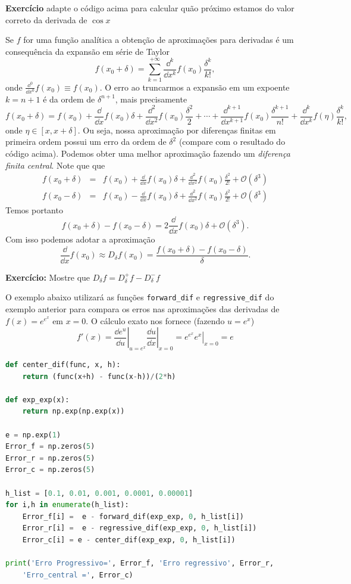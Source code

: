 {\bf Exercício} adapte o código acima para calcular quão próximo estamos do valor correto da derivada de $\cos x$

Se $f$ for uma função analítica a obtenção de aproximações para derivadas é um consequência 
da expansão em série de Taylor
\[ f(x_0+\delta) = \sum_{k=1}^{+\infty} \frac{\dd^k}{\dd x^k}f(x_0) \frac{\delta^k}{k!},\]
onde $\frac{\dd^{0}}{\dd x^{0}} f(x_0) \equiv f(x_0)$. O erro ao truncarmos a expansão em um expoente $k=n+1$ é da ordem de $\delta^{n+1}$, mais precisamente
\[ f(x_0+\delta) = f(x_0) + \frac{\dd}{\dd x} f(x_0)\delta + \frac{\dd^2}{\dd x^2}f(x_0) \frac{\delta^2}{2} + \cdots + \frac{\dd^{k+1}}{\dd x^{k+1}}f(x_0) \frac{\delta^{k+1}}{n!}+\frac{\dd^k}{\dd x^k}f(\eta) \frac{\delta^k}{k!},\]
onde $\eta \in [x, x+\delta]$. Ou seja, nossa aproximação por diferenças finitas em primeira ordem possui um erro da ordem de $\delta^2$ (compare com o resultado do código acima). Podemos obter uma melhor aproximação fazendo um {\it diferença finita central}. Note que que
\[\begin{array}{rcl}
f(x_0+\delta) & = & f(x_0) + \frac{\dd}{\dd x}f(x_0) \delta + \frac{\dd^2}{\dd x^2}f(x_0)  \frac{\delta^2}{2!}+ \mathcal{O}(\delta^3)\\
f(x_0-\delta) & = & f(x_0) - \frac{\dd}{\dd x}f(x_0) \delta + \frac{\dd^2}{\dd x^2}f(x_0)  \frac{\delta^2}{2!}+ \mathcal{O}(\delta^3)
\end{array}\]
Temos portanto
\[f(x_0+\delta) - f(x_0-\delta) = 2 \frac{\dd}{\dd x}f(x_0) \delta + \mathcal{O}(\delta^3).\]
Com isso podemos adotar a aproximação
\[\frac{\dd }{\dd x} f(x_0) \approx D_\delta f (x_0) = \frac{f(x_0+\delta) - f(x_0-\delta)}{\delta}.\]

{\bf Exercício:} Mostre que $D_\delta f = D^+_\delta f - D^-_\delta f$

O exemplo abaixo utilizará as funções \lstinline{forward_dif} e \lstinline{regressive_dif} do exemplo anterior para compara os erros nas aproximações das derivadas de $f(x) = e^{e^x}$ em $x = 0$. O cálculo exato nos fornece (fazendo $u=e^x$)
\[f'(x) = \left.\frac{\dd e^u}{\dd u}\right|_{u=e^x} \left.\frac{\dd u}{\dd x}\right|_{x=0} = \left. e^{e^x}e^x \right|_{x=0} = e \]

\begin{lstlisting}[language = Python]
def center_dif(func, x, h):
    return (func(x+h) - func(x-h))/(2*h)

def exp_exp(x):
    return np.exp(np.exp(x))

e = np.exp(1)
Error_f = np.zeros(5)
Error_r = np.zeros(5)
Error_c = np.zeros(5)

h_list = [0.1, 0.01, 0.001, 0.0001, 0.00001]
for i,h in enumerate(h_list):
    Error_f[i] =  e - forward_dif(exp_exp, 0, h_list[i])
    Error_r[i] =  e - regressive_dif(exp_exp, 0, h_list[i])
    Error_c[i] = e - center_dif(exp_exp, 0, h_list[i])

print('Erro Progressivo=', Error_f, 'Erro regressivo', Error_r, 
    'Erro_central =', Error_c)
\end{lstlisting}

